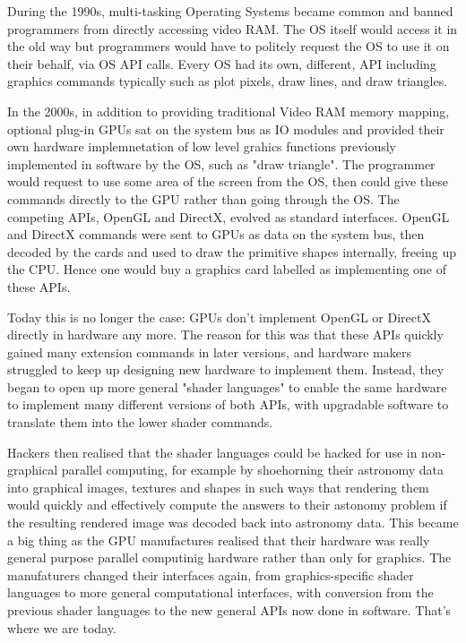 \documentclass[oneside,english]{scrbook}
\begin{document}
During the 1990s, multi-tasking Operating Systems became common and banned programmers from directly accessing video RAM.  The OS itself would access it in the old way but programmers would have to politely request the OS to use it on their behalf, via OS API calls. Every OS had its own, different, API including graphics commands typically such as plot pixels, draw lines, and draw triangles.

In the 2000s, in addition to providing traditional Video RAM memory mapping, optional plug-in GPUs sat on the system bus as IO modules and provided their own hardware implemnetation of low level grahics functions previously implemented in software by the OS, such as "draw triangle".  The programmer would request to use some area of the screen from the OS, then could give these commands directly to the GPU rather than going through the OS.   The competing APIs, OpenGL and DirectX, evolved as standard interfaces.  OpenGL and DirectX commands were sent to GPUs as data on the system bus, then decoded by the cards and used to draw the primitive shapes internally, freeing up the CPU.  Hence one would buy a graphics card labelled as implementing one of these APIs.   

Today this is no longer the case: GPUs don't implement OpenGL or DirectX directly in hardware any more.  The reason for this was that these APIs quickly gained many extension commands in later versions, and hardware makers struggled to keep up designing new hardware to implement them. Instead, they began to open up more general "shader languages" to enable the same hardware to implement many different versions of both APIs, with upgradable software to translate them into the lower shader commands.  

Hackers then realised that the shader languages could be hacked for use in non-graphical parallel computing, for example by shoehorning their astronomy data into graphical images, textures and shapes in such ways that rendering them would quickly and effectively compute the answers to their astonomy problem if the resulting rendered image was decoded back into astronomy data.    This became a big thing as the GPU manufactures realised that their hardware was really general purpose parallel computinig hardware rather than only for graphics.  The manufaturers changed their interfaces again, from graphics-specific shader languages to more general computational interfaces, with conversion from the previous shader languages to the new general APIs now done in software.  That's where we are today.
\end{document}
